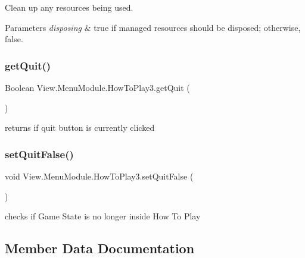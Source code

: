 Clean up any resources being used. 


\begin{DoxyParams}{Parameters}
{\em disposing} & true if managed resources should be disposed; otherwise, false.\\
\hline
\end{DoxyParams}
\hypertarget{class_view_1_1_menu_module_1_1_how_to_play3_a32b39a8045e75e8cae4c94677d1be020}{}\label{class_view_1_1_menu_module_1_1_how_to_play3_a32b39a8045e75e8cae4c94677d1be020} 
\subsubsection{\texorpdfstring{get\+Quit()}{getQuit()}}
{\footnotesize\ttfamily Boolean View.\+Menu\+Module.\+How\+To\+Play3.\+get\+Quit (\begin{DoxyParamCaption}{ }\end{DoxyParamCaption})\hspace{0.3cm}{\ttfamily [inline]}}

returns if quit button is currently clicked \hypertarget{class_view_1_1_menu_module_1_1_how_to_play3_a7fd292034475f8a0fcb57a401808d043}{}\label{class_view_1_1_menu_module_1_1_how_to_play3_a7fd292034475f8a0fcb57a401808d043} 
\subsubsection{\texorpdfstring{set\+Quit\+False()}{setQuitFalse()}}
{\footnotesize\ttfamily void View.\+Menu\+Module.\+How\+To\+Play3.\+set\+Quit\+False (\begin{DoxyParamCaption}{ }\end{DoxyParamCaption})\hspace{0.3cm}{\ttfamily [inline]}}

checks if Game State is no longer inside How To Play 

\subsection{Member Data Documentation}
\hypertarget{class_view_1_1_menu_module_1_1_how_to_play3_a67ceaf31171526b8fab29a36094e983d}{}\label{class_view_1_1_menu_module_1_1_how_to_play3_a67ceaf31171526b8fab29a36094e983d} 
